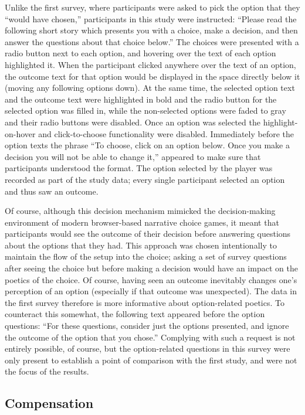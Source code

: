 Unlike the first survey, where participants were asked to pick the option that they ``would have chosen,'' participants in this study were instructed:
%
``Please read the following short story which presents you with a choice, make a decision, and then answer the questions about that choice below.''
%
The choices were presented with a radio button next to each option, and hovering over the text of each option highlighted it.
%
When the participant clicked anywhere over the text of an option, the outcome text for that option would be displayed in the space directly below it (moving any following options down).
%
At the same time, the selected option text and the outcome text were highlighted in bold and the radio button for the selected option was filled in, while the non-selected options were faded to gray and their radio buttons were disabled.
%
Once an option was selected the highlight-on-hover and click-to-choose functionality were disabled.
%
Immediately before the option texts the phrase ``To choose, click on an option below. Once you make a decision you will not be able to change it,'' appeared to make sure that participants understood the format.
%
The option selected by the player was recorded as part of the study data; every single participant selected an option and thus saw an outcome.


Of course, although this decision mechanism mimicked the decision-making environment of modern browser-based narrative choice games, it meant that participants would see the outcome of their decision before answering questions about the options that they had.
%
This approach was chosen intentionally to maintain the flow of the setup into the choice; asking a set of survey questions after seeing the choice but before making a decision would have an impact on the poetics of the choice.
%
Of course, having seen an outcome inevitably changes one's perception of an option (especially if that outcome was unexpected).
%
The data in the first survey therefore is more informative about option-related poetics.
%
To counteract this somewhat, the following text appeared before the option questions:
%
``For these questions, consider just the options presented, and ignore the outcome of the option that you chose.''
%
Complying with such a request is not entirely possible, of course, but the option-related questions in this survey were only present to establish a point of comparison with the first study, and were not the focus of the results.


\subsection{Compensation}


